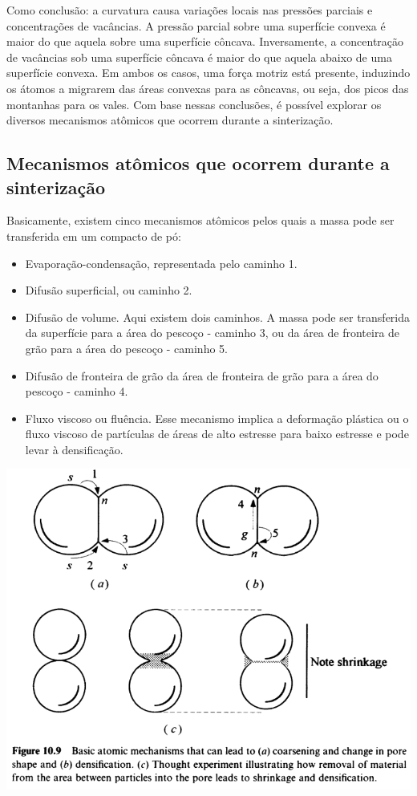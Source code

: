 Como conclusão: a curvatura causa variações locais nas pressões parciais e concentrações de vacâncias. A pressão parcial sobre uma superfície convexa é maior do que aquela sobre uma superfície côncava. Inversamente, a concentração de vacâncias sob uma superfície côncava é maior do que aquela abaixo de uma superfície convexa. Em ambos os casos, uma força motriz está presente, induzindo os átomos a migrarem das áreas convexas para as côncavas, ou seja, dos picos das montanhas para os vales. Com base nessas conclusões, é possível explorar os diversos mecanismos atômicos que ocorrem durante a sinterização.

\subsection*{Mecanismos atômicos que ocorrem durante a sinterização}

Basicamente, existem cinco mecanismos atômicos pelos quais a massa pode ser transferida em um compacto de pó:

\begin{itemize}
    \item Evaporação-condensação, representada pelo caminho 1.
    \item Difusão superficial, ou caminho 2.
    \item Difusão de volume. Aqui existem dois caminhos. A massa pode ser transferida da superfície para a área do pescoço - caminho 3, ou da área de fronteira de grão para a área do pescoço - caminho 5.
    \item Difusão de fronteira de grão da área de fronteira de grão para a área do pescoço - caminho 4.
    \item Fluxo viscoso ou fluência. Esse mecanismo implica a deformação plástica ou o fluxo viscoso de partículas de áreas de alto estresse para baixo estresse e pode levar à densificação.
\end{itemize}

\includegraphics*[width=\linewidth]{./images/mecanismos_atomicos_coalescimento_densificacao.png}

